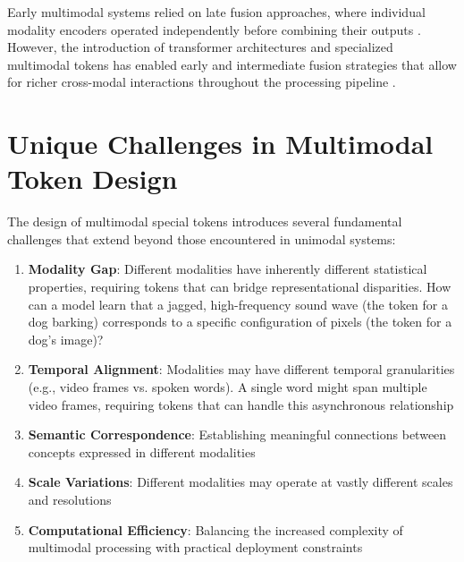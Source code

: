 Early multimodal systems relied on late fusion approaches, where individual modality encoders operated independently before combining their outputs \citep{tsimpoukelli2021multimodal}. However, the introduction of transformer architectures and specialized multimodal tokens has enabled early and intermediate fusion strategies that allow for richer cross-modal interactions throughout the processing pipeline \citep{li2022blip, alayrac2022flamingo}.

\section{Unique Challenges in Multimodal Token Design}

The design of multimodal special tokens introduces several fundamental challenges that extend beyond those encountered in unimodal systems:

\begin{enumerate}
\item \textbf{Modality Gap}: Different modalities have inherently different statistical properties, requiring tokens that can bridge representational disparities. How can a model learn that a jagged, high-frequency sound wave (the token for a dog barking) corresponds to a specific configuration of pixels (the token for a dog's image)?
\item \textbf{Temporal Alignment}: Modalities may have different temporal granularities (e.g., video frames vs. spoken words). A single word might span multiple video frames, requiring tokens that can handle this asynchronous relationship
\item \textbf{Semantic Correspondence}: Establishing meaningful connections between concepts expressed in different modalities
\item \textbf{Scale Variations}: Different modalities may operate at vastly different scales and resolutions
\item \textbf{Computational Efficiency}: Balancing the increased complexity of multimodal processing with practical deployment constraints
\end{enumerate}
\begin{comment}
Examples for the above challenges:
- Modality Gap: "How can a model learn that a jagged, high-frequency sound wave (the token for a dog barking) corresponds to a specific configuration of pixels (the token for a dog's image)?"
- Temporal Alignment: "A single word might span multiple video frames, requiring tokens that can handle this asynchronous relationship."

STATUS: addressed - added concrete examples for Modality Gap and Temporal Alignment challenges
\end{comment}

